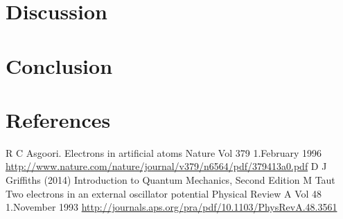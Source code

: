 \documentclass[norsk,a4paper,12pt]{article}
\begin{document}
\section{Discussion}
\section{Conclusion}

\newpage
\section{References}
\begingroup
\renewcommand{\section}[2]{}
\begin{thebibliography}{}
  R C Asgoori.\newline 
  Electrons in artificial atoms\newline
  Nature Vol 379 1.February 1996\newline
  \url{http://www.nature.com/nature/journal/v379/n6564/pdf/379413a0.pdf}
  D J Griffiths (2014)\newline
  Introduction to Quantum Mechanics, Second Edition
  M Taut \newline
  Two electrons in an external oscillator potential\newline
  Physical Review A Vol 48 1.November 1993\newline
  \url{http://journals.aps.org/pra/pdf/10.1103/PhysRevA.48.3561}
  
  

\end{thebibliography}
\end{document}
